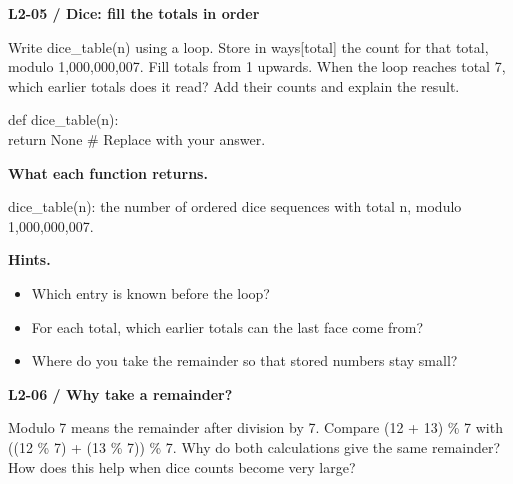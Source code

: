 \documentclass[11pt,a4paper]{article}
\begin{document}
\par\noindent\begin{minipage}{\linewidth}
\textbf{L2-05 / Dice: fill the totals in order}\par\smallskip Write dice\_table(n) using a loop. Store in ways[total] the count for that total, modulo 1,000,000,007. Fill totals from 1 upwards. When the loop reaches total 7, which earlier totals does it read? Add their counts and explain the result.\par
\par{}\par\smallskip\noindent\colorbox{codepaper}{\parbox{\dimexpr\linewidth-2\fboxsep\relax}{\small\ttfamily\raggedright def dice\_table(n):\\\hspace*{2.4em}return None  \# Replace with your answer.}}\par
{\small\textbf{What each function returns.}\par dice\_table(n): the number of ordered dice sequences with total n, modulo 1,000,000,007.\par }
{\small\textbf{Hints.}}\begin{itemize}\item Which entry is known before the loop?\item For each total, which earlier totals can the last face come from?\item Where do you take the remainder so that stored numbers stay small?\end{itemize}
\end{minipage}\par\vspace{4mm}
\par\noindent\begin{minipage}{\linewidth}
\textbf{L2-06 / Why take a remainder?}\par\smallskip Modulo 7 means the remainder after division by 7. Compare (12 + 13) \% 7 with ((12 \% 7) + (13 \% 7)) \% 7. Why do both calculations give the same remainder? How does this help when dice counts become very large?\par
\end{minipage}\par\vspace{4mm}
\end{document}
